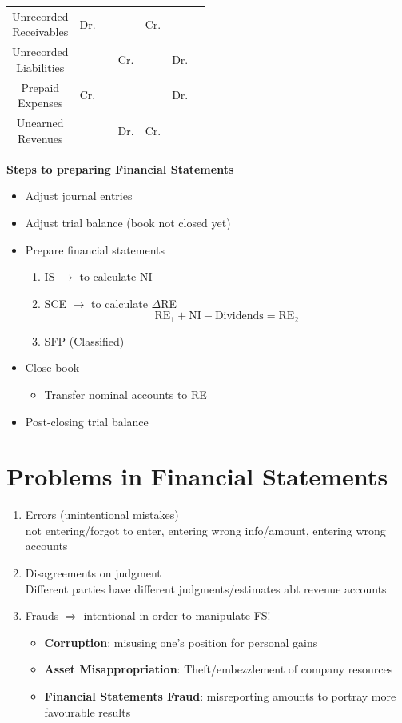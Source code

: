 \documentclass{article}
\begin{document}
\begin{multicols}{2}
\begin{table}[H]
{\begin{tabular}{c|c|c|c|ccc}
			\makecell{Unrecorded \\Receivables}&  Dr.&  &  & Cr. &  &  \\ \cline{1-2} \cline{4-7}
			\makecell{Unrecorded \\Liabilities}&  &  & Cr. &  & Dr. &  \\ \cline{1-2} \cline{4-7}
			\makecell{Prepaid\\Expenses}&  Cr.&  &  &  & Dr. &  \\ \cline{1-2} \cline{4-7}
			\makecell{Unearned\\Revenues}&  &  & Dr.  & Cr. &  &
		\end{tabular}
	}
\end{table}

\textbf{Steps to preparing Financial Statements}
\begin{itemize}
	\item Adjust journal entries
	\item Adjust trial balance (book not closed yet)
	\item Prepare financial statements
	\begin{enumerate}
		\item IS $\rightarrow$ to calculate NI
		\item SCE $\rightarrow$ to calculate $\Delta$RE
		$$\text{RE}_1 + \text{NI} - \text{Dividends} = \text{RE}_2$$
		\item SFP (Classified)
	\end{enumerate}
    \item Close book
    \begin{itemize}
    	\item Transfer nominal accounts to RE
    \end{itemize}
    \item Post-closing trial balance
\end{itemize}

\section{Problems in Financial Statements}
\begin{enumerate}
	\item Errors (unintentional mistakes)\\
	not entering/forgot to enter, entering wrong info/amount, entering wrong accounts
	\item Disagreements on judgment\\
	Different parties have different judgments/estimates abt revenue accounts
	\item Frauds $\Rightarrow$ intentional in order to manipulate FS!
	\begin{itemize}
		\item \textbf{Corruption}: misusing one's position for personal gains
		\item \textbf{Asset Misappropriation}: Theft/embezzlement of company resources
		\item \textbf{Financial Statements Fraud}: misreporting amounts to portray more favourable results
	\end{itemize}
\end{enumerate}


\end{multicols}
\end{document}
